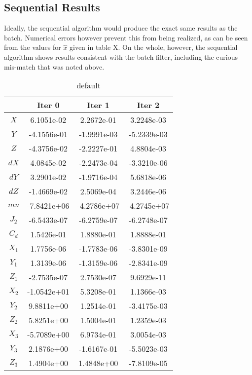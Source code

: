 \documentclass[10pt]{article}
\begin{document}
\subsection{Sequential Results}

Ideally, the sequential algorithm would produce the exact same results as the batch. Numerical errors however prevent this from being realized, as can be seen from the values for $\hat{x}$ given in table X. On the whole, however, the sequential algorithm shows results consistent with the batch filter, including the curious mis-match that was noted above. 

\begin{table}[htdp]
\caption{default}
\begin{center}
\begin{tabular}{|c|c|c|c|}
\hline
 & Iter 0 &  Iter 1 &  Iter 2 \\ 
 \hline\hline
$X  $ &  6.1051e-02 &  2.2672e-01 &  3.2248e-03 \\ 
$Y  $ & -4.1556e-01 & -1.9991e-03 & -5.2339e-03 \\ 
$Z  $ & -4.3756e-02 & -2.2227e-01 &  4.8804e-03 \\ 
$dX $ &  4.0845e-02 & -2.2473e-04 & -3.3210e-06 \\ 
$dY $ &  3.2901e-02 & -1.9716e-04 &  5.6818e-06 \\ 
$dZ $ & -1.4669e-02 &  2.5069e-04 &  3.2446e-06 \\ 
$mu $ & -7.8421e+06 & -4.2786e+07 & -4.2745e+07 \\ 
$J_2$ & -6.5433e-07 & -6.2759e-07 & -6.2748e-07 \\ 
$C_d$ &  1.5426e-01 &  1.8880e-01 &  1.8888e-01 \\ 
$X_1$ &  1.7756e-06 & -1.7783e-06 & -3.8301e-09 \\ 
$Y_1$ &  1.3139e-06 & -1.3159e-06 & -2.8341e-09 \\ 
$Z_1$ & -2.7535e-07 &  2.7530e-07 &  9.6929e-11 \\ 
$X_2$ & -1.0542e+01 &  5.3208e-01 &  1.1366e-03 \\ 
$Y_2$ &  9.8811e+00 &  1.2514e-01 & -3.4175e-03 \\ 
$Z_2$ &  5.8251e+00 &  1.5004e-01 &  1.2359e-03 \\ 
$X_3$ & -5.7089e+00 &  6.9734e-01 &  3.0054e-03 \\ 
$Y_3$ &  2.1876e+00 & -1.6167e-01 & -5.5023e-03 \\ 
$Z_3$ &  1.4904e+00 &  1.4848e+00 & -7.8109e-05 \\ 
\hline
\end{tabular}
\end{center}
\label{default}
\end{table}%
\end{document}
